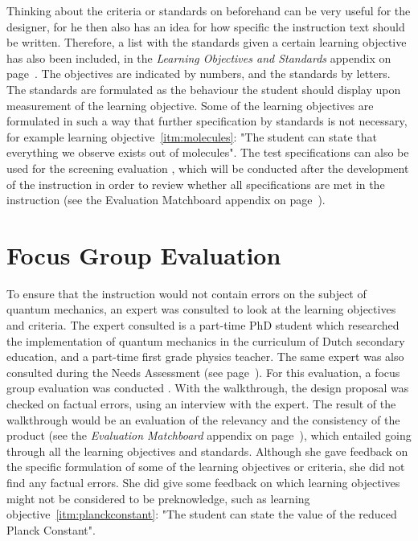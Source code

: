 \documentclass[11pt,twoside]{report} %
\begin{document}
Thinking about the criteria or standards on beforehand can be very useful for the designer, for he then also has an idea for how specific the instruction text should be written. Therefore, a list with the standards given a certain learning objective has also been included, in the \emph{Learning Objectives and Standards} appendix on page~\pageref{app:objectivestandards}. The objectives are indicated by numbers, and the standards by letters. The standards are formulated as the behaviour the student should display upon measurement of the learning objective. Some of the learning objectives are formulated in such a way that further specification by standards is not necessary, for example learning objective~\ref{itm:molecules}: "The student can state that everything we observe exists out of molecules". The test specifications can also be used for the screening evaluation \cite{evamatchboard}, which will be conducted after the development of the instruction in order to review whether all specifications are met in the instruction (see the Evaluation Matchboard appendix on page~\pageref{app:evamatchboard}).

\chapter{Focus Group Evaluation}
\label{ch:focusgroup}

To ensure that the instruction would not contain errors on the subject of quantum mechanics, an expert was consulted to look at the learning objectives and criteria. The expert consulted is a part-time PhD student which researched the implementation of quantum mechanics in the curriculum of Dutch secondary education, and a part-time first grade physics teacher. The same expert was also consulted during the Needs Assessment (see page~\pageref{ssch:problem}). For this evaluation, a focus group evaluation was conducted \cite{evamatchboard}. With the walkthrough, the design proposal was checked on factual errors, using an interview with the expert. The result of the walkthrough would be an evaluation of the relevancy and the consistency of the product (see the \emph{Evaluation Matchboard} appendix on page~\pageref{app:evamatchboard}), which entailed going through all the learning objectives and standards. Although she gave  feedback on the specific formulation of some of the learning objectives or criteria, she did not find any factual errors. She did give some feedback on which learning objectives might not be considered to be preknowledge, such as learning objective~\ref{itm:planckconstant}: "The student can state the value of the reduced Planck Constant".
\end{document}
